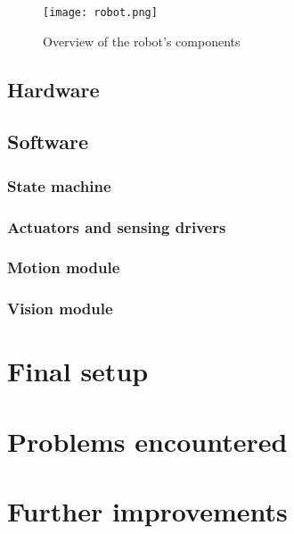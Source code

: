\documentclass[11pt]{article}
\begin{document}


\begin{figure}[h!]
\centering
	\texttt{[image: robot.png]}

\caption{Overview of the robot's components}
\label{fig:overview}
\end{figure}


\subsection{Hardware}


	
\subsection{Software}



\subsubsection{State machine}



\subsubsection{Actuators and sensing drivers}


\subsubsection{Motion module}


\subsubsection{Vision module}


\section{ Final setup }


\section{Problems encountered}




\section{Further improvements}
\label{sec:future-improvements}




\printbibliography
\end{document}
